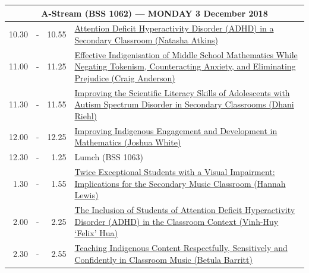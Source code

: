 \documentclass[twoside,12pt,a4paper,notitlepage]{memoir}
\begin{document}
\pagebreak
\begin{center}
\begin{tabular}{rcr|p{10.8cm}}
 \multicolumn{4}{c}{{\large A-Stream (BSS 1062) --- MONDAY 3 December 2018}} \\ \hline
 10.30 & - & 10.55 & 
 \hyperref[aut:atkins]{Attention Deficit Hyperactivity Disorder (ADHD) in a Secondary Classroom (Natasha Atkins)} \\ \hline
11.00 & - & 11.25 &
 \hyperref[aut:anderson]{Effective Indigenisation of Middle School Mathematics While Negating Tokenism, Counteracting Anxiety, and Eliminating Prejudice (Craig Anderson)} \\ \hline
11.30 & - & 11.55 &
 \hyperref[aut:riehl]{Improving the Scientific Literacy Skills of Adolescents with Autism Spectrum Disorder in Secondary Classrooms (Dhani Riehl)} \\ \hline
12.00 & - & 12.25 &
 \hyperref[aut:white]{Improving Indigenous Engagement and Development in Mathematics (Joshua White)} \\ \hline
12.30 & - & 1.25 & Lumch (BSS 1063) \\ \hline
1.30 & - & 1.55 &
 \hyperref[aut:lewis]{Twice Exceptional Students with a Visual Impairment: Implications for the Secondary Music Classroom (Hannah Lewis)} \\ \hline
2.00 & - & 2.25 &
 \hyperref[aut:hua]{The Inclusion of Students of Attention Deficit Hyperactivity Disorder (ADHD) in the Classroom Context (Vinh-Huy `Felix' Hua)} \\ \hline
2.30 & - & 2.55 &
 \hyperref[aut:barritt]{Teaching Indigenous Content Respectfully, Sensitively and Confidently in Classroom Music (Betula Barritt)} \\ \hline
\end{tabular}
\end{center}
\end{document}
